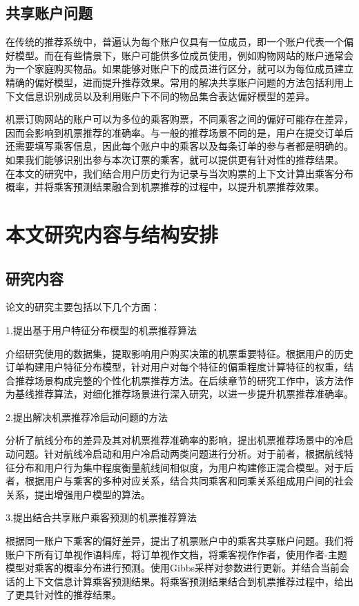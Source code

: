\subsection{共享账户问题}

在传统的推荐系统中，普遍认为每个账户仅具有一位成员，即一个账户代表一个偏好模型\cite{kabutoya2010modeling}。而在有些情景下，账户可能供多位成员使用，例如购物网站的账户通常会为一个家庭购买物品。如果能够对账户下的成员进行区分，就可以为每位成员建立精确的偏好模型，进而提升推荐效果。常用的解决共享账户问题的方法包括利用上下文信息识别成员\cite{adomavicius2011context}以及利用账户下不同的物品集合\cite{verstrepen2015top}表达偏好模型的差异。

机票订购网站的账户可以为多位的乘客购票，不同乘客之间的偏好可能存在差异，因而会影响到机票推荐的准确率。与一般的推荐场景不同的是，用户在提交订单后还需要填写乘客信息，因此每个账户中的乘客以及每条订单的参与者都是明确的。如果我们能够识别出参与本次订票的乘客，就可以提供更有针对性的推荐结果。
在本文的研究中，我们结合用户历史行为记录与当次购票的上下文计算出乘客分布概率，并将乘客预测结果融合到机票推荐的过程中，以提升机票推荐效果。


\section{本文研究内容与结构安排}
\subsection{研究内容}
论文的研究主要包括以下几个方面：

1.提出基于用户特征分布模型的机票推荐算法

介绍研究使用的数据集，提取影响用户购买决策的机票重要特征。根据用户的历史订单构建用户特征分布模型，针对用户对每个特征的偏重程度计算特征的权重，结合推荐场景构成完整的个性化机票推荐方法。在后续章节的研究工作中，该方法作为基线推荐算法，对细化推荐场景进行深入研究，以进一步提升机票推荐准确率。

2.提出解决机票推荐冷启动问题的方法

分析了航线分布的差异及其对机票推荐准确率的影响，提出机票推荐场景中的冷启动问题。针对航线冷启动和用户冷启动两类问题进行分析。对于前者，根据航线特征分布和用户行为集中程度衡量航线间相似度，为用户构建修正混合模型。对于后者，根据用户与乘客的多种对应关系，结合共同乘客和同乘关系组成用户间的社会关系，提出增强用户模型的算法。


3.提出结合共享账户乘客预测的机票推荐算法

根据同一账户下乘客的偏好差异，提出了机票账户中的乘客共享账户问题。我们将账户下所有订单视作语料库，将订单视作文档，将乘客视作作者，使用作者-主题模型对乘客的概率分布进行预测。使用Gibbs采样对参数进行更新。并结合当前会话的上下文信息计算乘客预测结果。将乘客预测结果结合到机票推荐过程中，给出了更具针对性的推荐结果。

